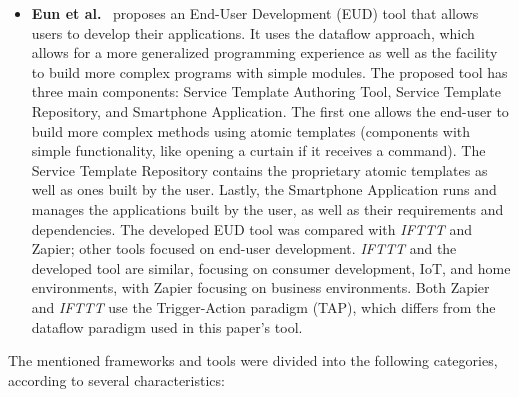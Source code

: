 \begin{itemize}
\item\textbf{Eun et al.}~\cite{eud_platform} proposes an End-User Development (EUD) tool that allows users to develop their applications. It uses the dataflow approach, which allows for a more generalized programming experience as well as the facility to build more complex programs with simple modules. The proposed tool has three main components: Service Template Authoring Tool, Service Template Repository, and Smartphone Application. The first one allows the end-user to build more complex methods using atomic templates (components with simple functionality, like opening a curtain if it receives a command). The Service Template Repository contains the proprietary atomic templates as well as ones built by the user. Lastly, the Smartphone Application runs and manages the applications built by the user, as well as their requirements and dependencies. The developed EUD tool was compared with \textit{IFTTT} and Zapier; other tools focused on end-user development. \textit{IFTTT} and the developed tool are similar, focusing on consumer development, IoT, and home environments, with Zapier focusing on business environments. Both Zapier and \textit{IFTTT} use the Trigger-Action paradigm (TAP), which differs from the dataflow paradigm used in this paper's tool.
\end{itemize}

The mentioned frameworks and tools were divided into the following categories, according to several characteristics:

